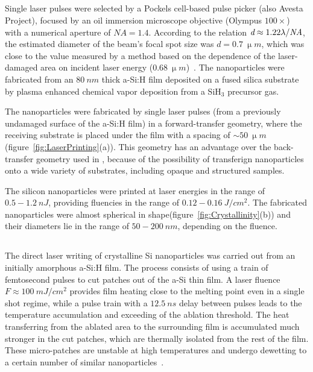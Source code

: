     \subsection{}
        Single laser pulses were selected by a Pockels cell-based pulse picker (also Avesta Project),
        focused by an oil immersion microscope objective (Olympus $100\times$)
        with a numerical aperture of $\mathit{NA}=1.4$. According to the relation $\emph{d}\approx 1.22\lambda/\mathit{NA}$, the estimated
        diameter of the beam's focal spot size was $d=0.7~\si{\upmu m}$, which was close to the value measured by a method based on
        the dependence of the laser-damaged area on incident laser energy ($0.68~\si{\upmu m}$)~\cite{liu1982simple}.
        The nanoparticles were fabricated from an $80~\si{nm}$ thick a-Si:H film deposited on a fused silica substrate by
        plasma enhanced chemical vapor deposition from a SiH$_{3}$ precursor gas.

            The nanoparticles were fabricated by single laser pulses (from a previously undamaged surface of the a-Si:H film) in a
        forward-transfer geometry, where the receiving substrate is placed under the film with a spacing
        of $\sim 50~\si{\upmu m}$ (figure~\ref{fig:LaserPrinting}(a)). This geometry has an advantage over the back-transfer geometry
        used in \cite{zywietz2014laser}, because of the possibility of transferign nanoparticles onto a wide variety of substrates,
        including opaque and structured samples.

            The silicon nanoparticles were printed at laser energies in the range of $0.5-1.2~\si{nJ}$, providing fluencies in
        the range of $0.12-0.16~\si{J/cm^{2}}$. The fabricated nanoparticles were almost spherical in shape(figure~\ref{fig:Crystallinity}(b))
        and their diameters lie in the range of $50-200~\si{nm}$, depending on the fluence.

    \subsection{}
            The direct laser writing of crystalline Si nanoparticles was carried out from an initially amorphous a-Si:H film.
        The process consists of using a train of femtosecond pulses to cut patches out of the a-Si thin film\cite{makarov2016controllable,
        dmitriev2016direct}. A laser fluence $F\approx100~\si{mJ/cm^{2}}$ provides film heating close to the melting point even in a
        single shot regime, while a pulse train with a $12.5~\si{ns}$ delay between pulses leads to the temperature accumulation
        and exceeding of the ablation threshold. The heat transferring from the ablated area to the surrounding film is accumulated
        much stronger in the cut patches, which are thermally isolated from the rest of the film.
        These micro-patches are unstable at high temperatures and undergo dewetting to a certain number of similar
        nanoparticles~\cite{thompson2012solid}.


\clearpage
